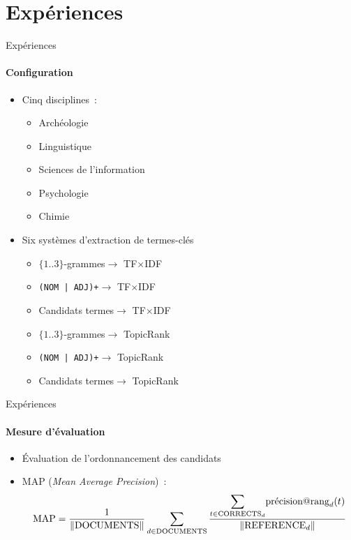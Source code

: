 \section{Expériences}
  \begin{frame}{Expériences}
    \framesubtitle{Configuration}

    \begin{itemize}
      \item{Cinq disciplines~:}
      \begin{itemize}
        \item{Archéologie}
        \item{Linguistique}
        \item{Sciences de l'information}
        \item{Psychologie}
        \item{Chimie}
      \end{itemize}
      \item<2->{Six systèmes d'extraction de termes-clés}
      \begin{itemize}
        \item{$\{1..3\}$-grammes\hfill$\longrightarrow$ TF$\times$IDF\hspace{14.75em}~}
        \item{\texttt{(NOM | ADJ)+}\hfill$\longrightarrow$ TF$\times$IDF\hspace{14.75em}~}
        \item{Candidats termes\hfill$\longrightarrow$ TF$\times$IDF\hspace{14.75em}~}
        \item{$\{1..3\}$-grammes\hfill$\longrightarrow$ TopicRank\hspace{13.915em}~}
        \item{\texttt{(NOM | ADJ)+}\hfill$\longrightarrow$ TopicRank\hspace{13.915em}~}
        \item{Candidats termes\hfill$\longrightarrow$ TopicRank\hspace{13.915em}~}
      \end{itemize}
    \end{itemize}
  \end{frame}

  \begin{frame}[allowframebreaks]{Expériences}
    \framesubtitle{Mesure d'évaluation}

    \begin{itemize}
      \item{Évaluation de l'ordonnancement des candidats}
      \item{MAP (\textit{Mean Average Precision})~:}
      \footnotesize
      \begin{align*}
        \text{MAP} = \frac{1}{\|\text{DOCUMENTS}\|} \sum_{d \in \text{DOCUMENTS}} \frac{\mathlarger\sum_{t \in \text{CORRECTS}_d} \text{précision}@\text{rang}_d(t)}{\|\text{REFERENCE}_d\|}
      \end{align*}
    \end{itemize}
  \end{frame}

